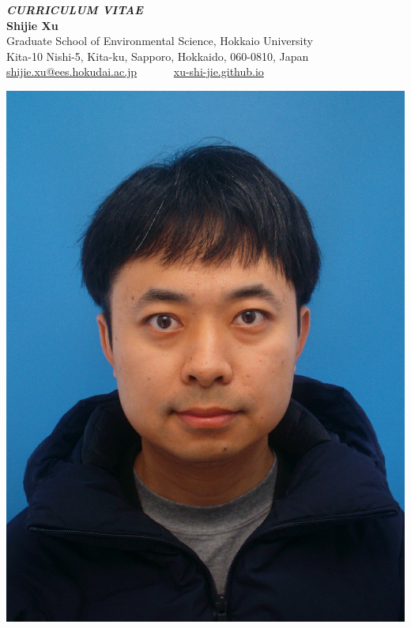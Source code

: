 \documentclass[a4paper,11pt]{article}
\begin{document}
\begin{minipage}[c]{0.75\textwidth} %
    {\Huge \textbf{\textit{CURRICULUM VITAE}}}\vspace{1cm}\\
    {\Huge \textbf{Shijie Xu}}\vspace{1cm}\\
    Graduate School of Environmental Science, Hokkaio University\\
    Kita-10 Nishi-5, Kita-ku, Sapporo, Hokkaido, 060-0810, Japan\\

    \href{mailto:shijie.xu@ees.hokudai.ac.jp}{shijie.xu@ees.hokudai.ac.jp} ~~~\textbullet{}~~~\href{https://xu-shi-jie.github.io}{xu-shi-jie.github.io}
\end{minipage}
\hfill
\begin{minipage}[c]{0.2\textwidth} %
    \includegraphics[width=\linewidth]{profile.JPG} %
\end{minipage}
\end{document}
